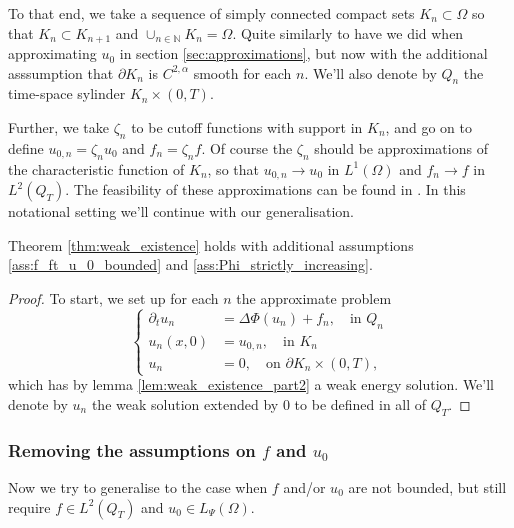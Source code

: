 \documentclass[11pt, a4paper]{article}
\begin{document}
To that end, we take a sequence of simply connected compact sets $K_n \subset \Omega$ so that $K_n \subset K_{n+1}$ and $\cup_{n \in \mathbb{N}}K_n = \Omega$. Quite similarly to have we did when approximating $u_0$ in section \ref{sec:approximations}, but now with the additional asssumption that $\partial K_n$ is $C^{2,\alpha}$ smooth for each $n$. We'll also denote by $Q_n$ the time-space sylinder $K_n \times (0,T)$. 

Further, we take $\zeta_n$ to be cutoff functions with support in $K_n$, and go on to define $u_{0,n} = \zeta_n u_0$ and $f_n = \zeta_n f$. Of course the $\zeta_n$ should be approximations of the characteristic function of $K_n$, so that $u_{0,n} \to u_0$ in $L^1(\Omega)$ and $f_n \to f$ in $L^2(Q_T)$. The feasibility of these approximations can be found in \citep[Sec. 5.3]{evans}. In this notational setting we'll continue with our generalisation.

\begin{proposition}
\label{prop:}
\end{proposition}


\begin{lemma}
Theorem \ref{thm:weak_existence} holds with additional assumptions \ref{ass:f_ft_u_0_bounded} and \ref{ass:Phi_strictly_increasing}.
\end{lemma}

\begin{proof}
To start, we set up for each $n$ the approximate problem
\begin{equation}
\begin{cases}
\partial_t u_n &= \Delta \Phi(u_n) + f_n, \quad \text{in } Q_n \\
u_n(x,0) &= u_{0,n}, \quad \text{in } K_n \\
u_n &= 0, \quad \text{on } \partial K_n \times (0,T), 
\end{cases}
\end{equation}
which has by lemma \ref{lem:weak_existence_part2} a weak energy solution. We'll denote by $u_n$ the weak solution extended by $0$ to be defined in all of $Q_T$.

\end{proof}


\subsubsection{Removing the assumptions on $f$ and $u_0$}
Now we try to generalise to the case when $f$ and/or $u_0$ are not bounded, but still require $f \in L^2(Q_T)$ and $u_0 \in L_{\Psi}(\Omega)$.
\end{document}
